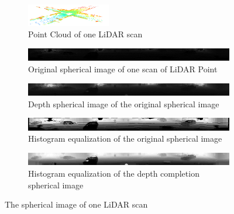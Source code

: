 \documentclass[sigconf]{acmart}
\begin{document}
\begin{figure}[h]
     \centering
     
     \begin{subfigure}[b]{0.9\textwidth}
         \centering
         \includegraphics[width=0.4\textwidth]{Figures/lidar point.png}
         \caption{Point Cloud of one LiDAR scan}
         \label{fig:spherical a}
     \end{subfigure}
    
     \begin{subfigure}[b]{0.8\textwidth}
         \centering
         \includegraphics[width=\textwidth]{Figures/spherical image b.png}
         \caption{Original spherical image of one scan of LiDAR Point}
         \label{fig:spherical b}
     \end{subfigure}
     
     \begin{subfigure}[b]{0.8\textwidth}
         \centering
         \includegraphics[width=\textwidth]{Figures/spherical image c.png}
         \caption{Depth spherical image of the original spherical image}
         \label{fig:spherical c}
     \end{subfigure}
     

     \begin{subfigure}[b]{0.8\textwidth}
         \centering
         \includegraphics[width=\textwidth]{Figures/spherical image d.png}
         \caption{Histogram equalization of the original spherical image}
         \label{fig:spherical d}
     \end{subfigure}
     
     \begin{subfigure}[b]{0.8\textwidth}
         \centering
         \includegraphics[width=\textwidth]{Figures/spherical image e.png}
         \caption{Histogram equalization of the depth completion spherical image}
         \label{fig:spherical e}
     \end{subfigure}
     
        \caption{The spherical image of one LiDAR scan}
        \label{fig:spherical}
\end{figure}
\end{document}
